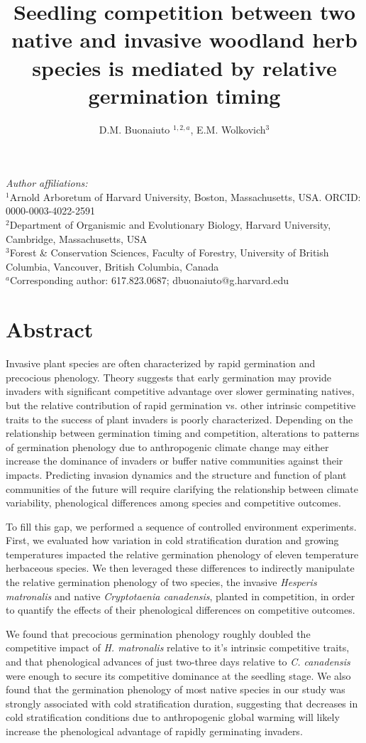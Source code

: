 \documentclass{article}[11pt]
\title{Seedling competition between two native %
and invasive %
woodland herb species is mediated by relative germination timing}
\author{D.M. Buonaiuto $^{1,2,a}$, E.M. Wolkovich$^{3}$}
\begin{document}

\maketitle
\noindent \emph{Author affiliations:}\\
\noindent $^1$Arnold Arboretum of Harvard University, Boston, Massachusetts, USA. ORCID: 0000-0003-4022-2591\\
$^2$Department of Organismic and Evolutionary Biology, Harvard University, Cambridge, Massachusetts, USA \\
$^3$Forest \& Conservation Sciences, Faculty of Forestry, University of British Columbia, Vancouver, British Columbia, Canada\\
$^a$Corresponding author: 617.823.0687; dbuonaiuto@g.harvard.edu\\
\pagebreak
\section*{Abstract}
Invasive plant species are often characterized by rapid germination and precocious phenology. Theory suggests that early germination may provide invaders with significant competitive advantage over slower germinating natives, but the relative contribution of rapid germination vs. other intrinsic competitive traits to the success of plant invaders is poorly characterized. Depending on the relationship between germination timing and competition, alterations to patterns of germination phenology due to anthropogenic climate change may either increase the dominance of invaders or buffer native communities against their impacts. Predicting invasion dynamics and the structure and function of plant communities of the future will require clarifying the relationship between climate variability, phenological differences among species and competitive outcomes.

To fill this gap, we performed a sequence of controlled environment experiments. First, we evaluated how variation in cold stratification duration and growing temperatures impacted the relative germination phenology of eleven temperature herbaceous species. We then leveraged these differences to indirectly manipulate the relative germination phenology of two species, the invasive \textit{Hesperis matronalis} and native \textit{Cryptotaenia canadensis}, planted in competition, in order to quantify the effects of their phenological differences on competitive outcomes.

We found that precocious germination phenology roughly doubled the competitive impact of \textit{H. matronalis} relative to it's intrinsic competitive traits, and that phenological advances of just two-three days relative to \textit{C. canadensis} were enough to secure its competitive dominance at the seedling stage. We also found that the germination phenology of most native species in our study was strongly associated with cold stratification duration, suggesting that decreases in cold stratification conditions due to anthropogenic global warming will likely increase the phenological advantage of rapidly germinating invaders. 
\end{document}
